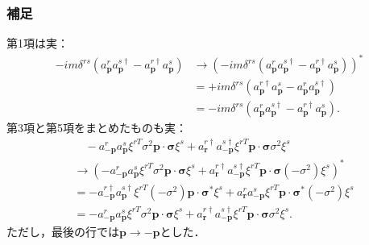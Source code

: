 \documentclass[pdflatex,unicode,ja=standard,12pt]{beamer}
\begin{document}
\begin{frame}[noframenumbering]
  
  \frametitle{補足\ \subsecname}
  \thispagestyle{empty}

  第1項は実：
  \begin{align}
    -im\delta^{rs}
    (
      a_{\mathbf{p}}^ra_{\mathbf{p}}^{s\dag}
      -
      a_{\mathbf{p}}^{r\dag}a_{\mathbf{p}}^s
    )
    &\rightarrow
    \left(  
      -im\delta^{rs}
      (
        a_{\mathbf{p}}^ra_{\mathbf{p}}^{s\dag}
        -
        a_{\mathbf{p}}^{r\dag}a_{\mathbf{p}}^s
      )
    \right)^*
    \nonumber
    \\
    &=
    +im\delta^{rs}
    (
      a_{\mathbf{p}}^{r\dag}a_{\mathbf{p}}^{s}
      -
      a_{\mathbf{p}}^{r}a_{\mathbf{p}}^{s\dag}
    )
    \nonumber
    \\
    &=
    -im\delta^{rs}
    (
      a_{\mathbf{p}}^ra_{\mathbf{p}}^{s\dag}
      -
      a_{\mathbf{p}}^{r\dag}a_{\mathbf{p}}^s
    )
    .
  \end{align}
  第3項と第5項をまとめたものも実：
  \begin{align}
    &\quad
    -a_{-\mathbf{p}}^ra_{\mathbf{p}}^s
    \xi^{rT}\sigma^2\mathbf{p}\cdot\bm{\sigma}\xi^s
    +
    a_{\mathbf{r}}^{r\dag}a_{-\mathbf{p}}^{s\dag}
    \xi^{rT}
    \mathbf{p}\cdot\bm{\sigma}\sigma^2
    \xi^s
    \nonumber
    \\
    &\rightarrow
    (
      -a_{-\mathbf{p}}^ra_{\mathbf{p}}^s
      \xi^{rT}\sigma^2\mathbf{p}\cdot\bm{\sigma}\xi^s
      +
      a_{\mathbf{r}}^{r\dag}a_{-\mathbf{p}}^{s\dag}
      \xi^{rT}
      \mathbf{p}\cdot\bm{\sigma}(-\sigma^2)
      \xi^s
    )^*
    \nonumber
    \\
    &=
    -a_{-\mathbf{p}}^{r\dag}a_{\mathbf{p}}^{s\dag}
    \xi^{rT}(-\sigma^2)\mathbf{p}\cdot\bm{\sigma}^*\xi^s
    +
    a_{\mathbf{r}}^{r}a_{-\mathbf{p}}^{s}
    \xi^{rT}
    \mathbf{p}\cdot\bm{\sigma}^*(-\sigma^2)
    \xi^s
    \nonumber
    \\
    &=
    -a_{-\mathbf{p}}^ra_{\mathbf{p}}^s
    \xi^{rT}\sigma^2\mathbf{p}\cdot\bm{\sigma}\xi^s
    +
    a_{\mathbf{r}}^{r\dag}a_{-\mathbf{p}}^{s\dag}
    \xi^{rT}
    \mathbf{p}\cdot\bm{\sigma}\sigma^2
    \xi^s
    .
  \end{align}
  ただし，最後の行では$\mathbf{p}\rightarrow-\mathbf{p}$とした．

\end{frame}
\end{document}
